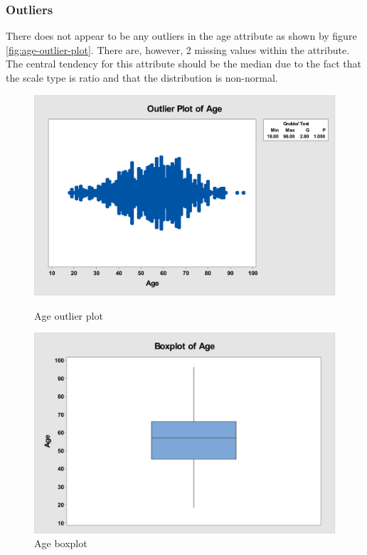 \documentclass[12pt]{article}
\begin{document}
      \subsubsection{Outliers}
        There does not appear to be any outliers in the age attribute as shown by figure \ref{fig:age-outlier-plot}. There are, however, 2 missing values within the attribute. The central tendency for this attribute should be the median due to the fact that the scale type is ratio and that the distribution is non-normal.

        \begin{figure}[H]
          \centering
          \begin{minipage}[b]{0.45\textwidth}
            \includegraphics[width=\textwidth]{age-outlier-plot}
            \caption{Age outlier plot}
            \label{fig:age-outlier-plot}
          \end{minipage}
          \hfill
          \begin{minipage}[b]{0.45\textwidth}
            \includegraphics[width=\textwidth]{age-boxplot}
            \caption{Age boxplot}
            \label{fig:age-boxplot}
          \end{minipage}
        \end{figure}
\end{document}
